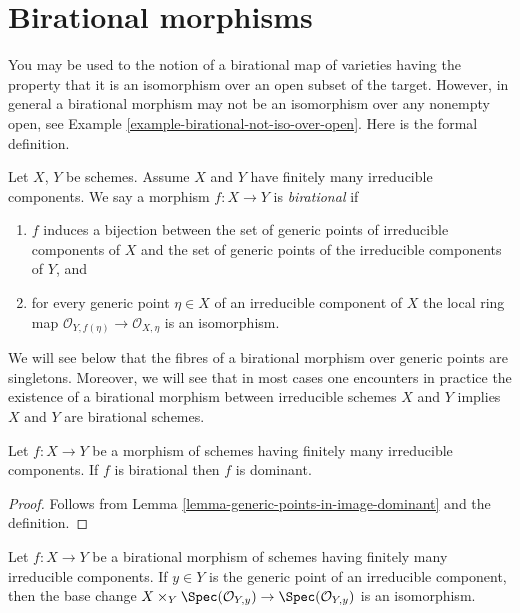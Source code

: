 \section{Birational morphisms}
\label{section-birational}

\noindent
You may be used to the notion of a birational map of varieties
having the property that it is an isomorphism over an open subset
of the target. However, in general a birational morphism may
not be an isomorphism over any nonempty open, see
Example \ref{example-birational-not-iso-over-open}.
Here is the formal definition.

\begin{definition}
\label{definition-birational}
\begin{reference}
\cite[(2.2.9)]{EGA1}
\end{reference}
Let $X$, $Y$ be schemes. Assume $X$ and $Y$ have finitely many
irreducible components. We say a morphism $f : X \to Y$ is
{\it birational} if
\begin{enumerate}
\item $f$ induces a bijection between the set of generic points
of irreducible components of $X$ and the set of generic points
of the irreducible components of $Y$, and
\item for every generic point $\eta \in X$ of an irreducible component
of $X$ the local ring map
$\mathcal{O}_{Y, f(\eta)} \to \mathcal{O}_{X, \eta}$
is an isomorphism.
\end{enumerate}
\end{definition}

\noindent
We will see below that the fibres of a birational morphism
over generic points are singletons. Moreover, we will see that
in most cases one encounters in practice the existence of a birational morphism
between irreducible schemes $X$ and $Y$ implies
$X$ and $Y$ are birational schemes.

\begin{lemma}
\label{lemma-birational-dominant}
Let $f : X \to Y$ be a morphism of schemes having finitely
many irreducible components. If $f$ is birational then
$f$ is dominant.
\end{lemma}

\begin{proof}
Follows from Lemma \ref{lemma-generic-points-in-image-dominant}
and the definition.
\end{proof}

\begin{lemma}
\label{lemma-birational-generic-fibres}
Let $f : X \to Y$ be a birational morphism of schemes having finitely
many irreducible components. If $y \in Y$ is the generic point of
an irreducible component, then the base change
$X \times_Y \Spec(\mathcal{O}_{Y, y}) \to \Spec(\mathcal{O}_{Y, y})$
is an isomorphism.
\end{lemma}


